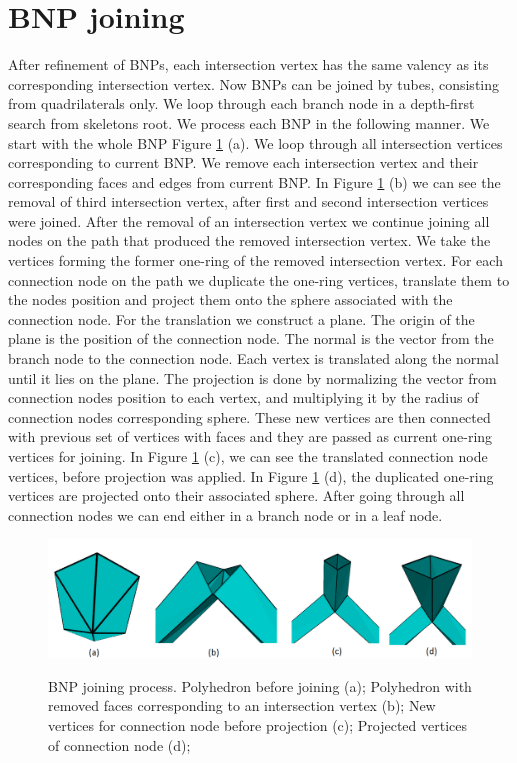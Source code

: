 \section{BNP joining}\label{sec:bnp_join}
After refinement of BNPs, each intersection vertex has the same valency as its corresponding intersection vertex. Now BNPs can be joined by tubes, consisting from quadrilaterals only. We loop through each branch node in a depth-first search from skeletons root. We process each BNP in the following manner. We start with the whole BNP Figure \ref{fig:joining_process_ilu} (a). We loop through all intersection vertices corresponding to current BNP. We remove each intersection vertex and their corresponding faces and edges from current BNP. In Figure \ref{fig:joining_process_ilu} (b) we can see the removal of third intersection vertex, after first and second intersection vertices were joined. After the removal of an intersection vertex we continue joining all nodes on the path that produced the removed intersection vertex. We take the vertices forming the former one-ring of the removed intersection vertex. For each connection node on the path we duplicate the one-ring vertices, translate them to the nodes position and project them onto the sphere associated with the connection node. For the translation we construct a plane. The origin of the plane is the position of the connection node. The normal is the vector from the branch node to the connection node. Each vertex is translated along the normal until it lies on the plane. The projection is done by normalizing the vector from connection nodes position to each vertex, and multiplying it by the radius of connection nodes corresponding sphere. These new vertices are then connected with previous set of vertices with faces and they are passed as current one-ring vertices for joining. In Figure \ref{fig:joining_process_ilu} (c), we can see the translated connection node vertices, before projection was applied. In Figure \ref{fig:joining_process_ilu} (d), the duplicated one-ring vertices are projected onto their associated sphere. After going through all connection nodes we can end either in a branch node or in a leaf node.

\begin{figure}[h]
    \centering
    \includegraphics[width=\textwidth]{images/joining_ilu.png}
    \label{fig:joining_process_ilu}
    \caption[BNP joining process]{BNP joining process. Polyhedron before joining (a); Polyhedron with removed faces corresponding to an intersection vertex (b); New vertices for connection node before projection (c); Projected vertices of connection node (d);}
\end{figure}

